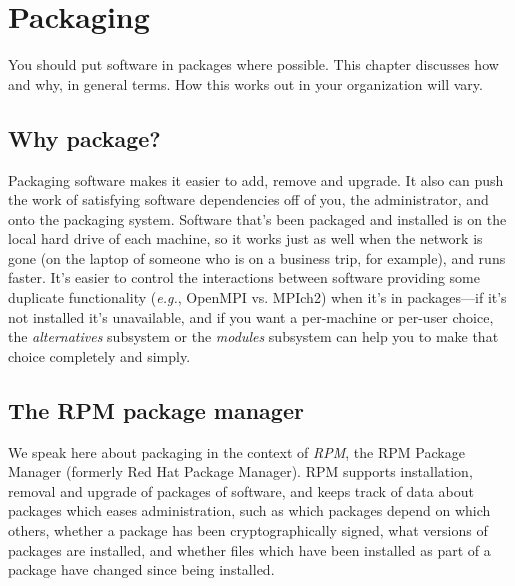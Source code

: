 %
%
%
\chapter{Packaging}
\label{Packaging}

You should put software in packages where possible. This chapter discusses
how and why, in general terms. How this works out in your organization
will vary.



\section{Why package?}

Packaging software makes it easier to add, remove and upgrade. It also can
push the work of satisfying software dependencies off of you, the
administrator, and onto the packaging system. Software that's been
packaged and installed is on the local hard drive of each machine, so it
works just as well when the network is gone (on the laptop of someone who
is on a business trip, for example), and runs faster. It's easier to
control the interactions between software providing some duplicate
functionality (\emph{e.g.}, OpenMPI vs.  MPIch2) when it's in
packages---if it's not installed it's unavailable, and if you want a
per-machine or per-user choice, the \emph{alternatives} subsystem or the
\emph{modules} subsystem can help you to make that choice completely and
simply.



\section{The RPM package manager}

We speak here about packaging in the context of \emph{RPM}, the RPM
Package Manager (formerly Red Hat Package Manager). RPM supports
installation, removal and upgrade of packages of software, and keeps track
of data about packages which eases administration, such as which packages
depend on which others, whether a package has been cryptographically
signed, what versions of packages are installed, and whether files which
have been installed as part of a package have changed since being
installed.

